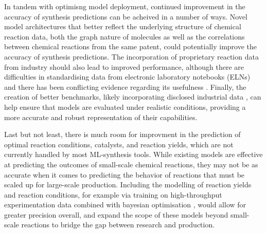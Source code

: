 In tandem with optimisng model deployment, continued improvement in the accuracy of synthesis predictions can be acheived in a number of ways. Novel model architectures that better reflect the underlying structure of chemical reaction data, both the graph nature of molecules as well as the correlations between chemical reactions from the same patent, could potentially improve the accuracy of synthesis predictions. The incorporation of proprietary reaction data from industry should also lead to improved performance, although there are difficulties in standardising data from electronic laboratory notebooks (ELNs) \cite{Jablonka2022OpenChemistry} and there has been conflicting evidence regarding its usefulness \cite{Thakkar2020DatasetsSynthesis, Wiest2023DatasetYields}. Finally, the creation of better benchmarks, likely incorporating disclosed industrial data \cite{Kearnes2021OpenReaction}, can help ensure that models are evaluated under realistic conditions, providing a more accurate and robust representation of their capabilities.

Last but not least, there is much room for improvment in the prediction of optimal reaction conditions, catalysts, and reaction yields, \cite{Ahneman2018PredictingCoupling, Schwaller2021YieldPrediction, Probst2022ReactionClassification} which are not currently handled by most ML-synthesis tools.  While existing models are effective at predicting the outcomes of small-scale chemical reactions, they may not be as accurate when it comes to predicting the behavior of reactions that must be scaled up for large-scale production. Including the modelling of reaction yields and reaction conditions, for example via training on high-throughput experimentation data \cite{king2022probing, xu2022roadmap} combined with bayesian optimisation \cite{Shields2021BayesOptReaction}, would allow for greater precision overall, and expand the scope of these models beyond small-scale reactions to bridge the gap between research and production.

